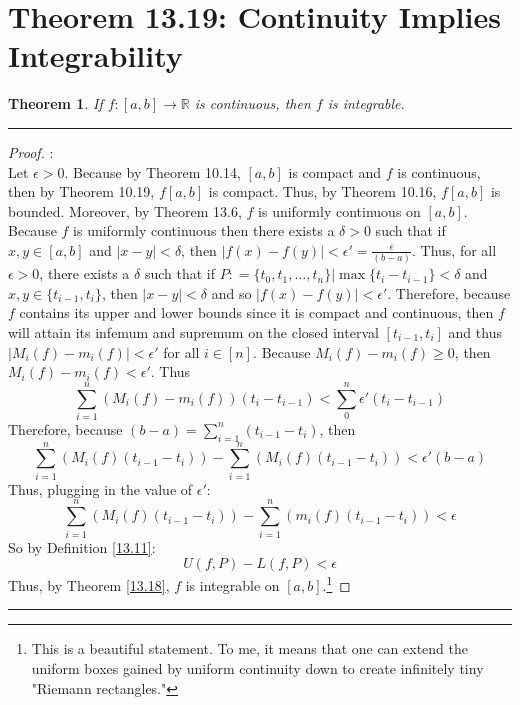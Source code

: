 \documentclass[openany, amssymb, psamsfonts]{amsart}
\newcommand{\bbR}{\mathbb{R}}
\newtheorem{thm}{Theorem}[section]
\theoremstyle{definition}
\numberwithin{equation}{section}
\begin{document}
\section*{Theorem 13.19: Continuity Implies Integrability}
\begin{thm}
	\label{13.19}
	If $f\colon [a, b] \to \bbR$ is continuous, then $f$ is integrable.
	
\end{thm}
\vspace{4pt}     \hrule   \vspace{4pt}\begin{proof}:\\
Let $\epsilon>0$. Because by Theorem 10.14, $[a,b]$ is compact and $f$ is continuous, then by Theorem 10.19, $f[a,b]$ is compact. Thus, by Theorem 10.16, $f[a,b]$ is bounded. Moreover, by Theorem 13.6, $f$ is uniformly continuous on $[a,b]$. Because $f$ is uniformly continuous then there exists a $\delta>0$ such that if $x,y \in [a,b]$ and $|x-y|< \delta$, then $|f(x) - f(y)|<\epsilon' = \frac{\epsilon}{(b-a)}$. Thus, for all $\epsilon>0$, there exists a $\delta$ such that if $P: = \{t_0, t_1, \dots, t_n\} | \max\{t_{i} - t_{i-1}\}<\delta$ and $x,y \in \{t_{i-1}, t_i\}$, then $|x-y|<\delta$ and so $|f(x) - f(y)|<\epsilon'$. Therefore, because $f$ contains its upper and lower bounds since it is compact and continuous, then $f$ will attain its infemum and supremum on the closed interval $[t_{i-1}, t_i]$ and thus $|M_i(f) - m_i(f)|<\epsilon'$ for all $i\in [n]$. Because $M_i(f) - m_i(f) \geq 0$, then $M_i(f) - m_i(f) < \epsilon'$. Thus \[\sum_{i=1}^{n}(M_i(f) - m_i(f))(t_{i} - t_{i-1}) < \sum_0^n\epsilon'(t_i-t_{i-1}) \] Therefore, because $(b-a) = \sum_{i=1}^{n}(t_{i-1} - t_i)$, then \[\sum_{i=1}^{n}(M_i(f)(t_{i-1} - t_i)) - \sum_{i=1}^{n}(M_i(f)(t_{i-1} - t_i)) < \epsilon'(b-a) \]
Thus, plugging in the value of $\epsilon'$:
\[\sum_{i=1}^{n}(M_i(f)(t_{i-1} - t_i)) - \sum_{i=1}^{n}(m_i(f)(t_{i-1} - t_i)) < \epsilon \]
So by Definition \ref{13.11}:
\[U(f,P) - L(f,P) < \epsilon \] Thus, by Theorem \ref{13.18}, $f$ is integrable on $[a,b].$\footnote{This is a beautiful statement. To me, it means that one can extend the uniform boxes gained by uniform continuity down to create infinitely tiny "Riemann rectangles."}
\end{proof}\vspace{4pt}     \hrule   \vspace{4pt}
\end{document}
